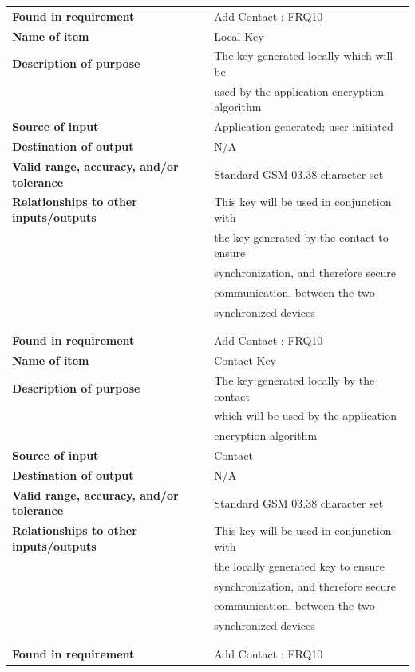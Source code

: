 \begin{tabular}{ll}
\textbf{Found in requirement}&Add Contact : FRQ10\\
\textbf{Name of item}&Local Key\\
\textbf{Description of purpose}&The key generated locally which will be\\& used by the application encryption algorithm\\
\textbf{Source of input}&Application generated; user initiated\\
\textbf{Destination of output}&N/A\\
\textbf{Valid range, accuracy, and/or tolerance}&Standard GSM 03.38 character set\\
\textbf{Relationships to other inputs/outputs}&This key will be used in conjunction with\\& the key generated by the contact to ensure\\& synchronization, and therefore secure\\& communication, between the two \\&synchronized devices\\
&\\
&\\
\textbf{Found in requirement}&Add Contact : FRQ10\\
\textbf{Name of item}&Contact Key\\
\textbf{Description of purpose}&The key generated locally by the contact\\& which will be used by the application\\& encryption algorithm\\
\textbf{Source of input}&Contact\\
\textbf{Destination of output}&N/A\\
\textbf{Valid range, accuracy, and/or tolerance}&Standard GSM 03.38 character set\\
\textbf{Relationships to other inputs/outputs}&This key will be used in conjunction with\\& the locally generated key to ensure\\& synchronization, and therefore secure\\& communication, between the two \\&synchronized devices\\
&\\
&\\
\textbf{Found in requirement}&Add Contact : FRQ10\\

\end{tabular}
